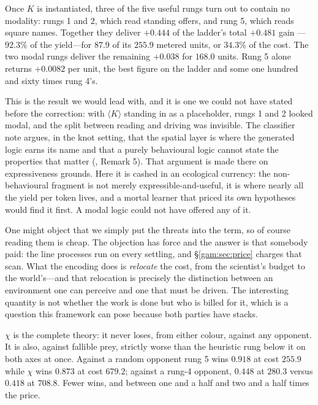 \begin{observation}\label{gam:obs:spatial}
Once $K$ is instantiated, three of the five useful rungs turn out to contain no
modality: rungs 1 and 2, which read standing offers, and rung 5, which reads
square names. Together they deliver $+0.444$ of the ladder's total $+0.481$ gain
---$92.3\%$ of the yield---for $87.9$ of its $255.9$ metered units, or $34.3\%$
of the cost. The two modal rungs deliver the remaining $+0.038$ for $168.0$
units. Rung 5 alone returns $+0.0082$ per unit, the best figure on the ladder
and some one hundred and sixty times rung 4's.
\end{observation}

This is the result we would lead with, and it is one we could not have stated
before the correction: with $\langle K\rangle$ standing in as a placeholder,
rungs 1 and 2 looked modal, and the split between reading and driving was
invisible. The classifier note argues, in the knot setting, that the spatial
layer is where the generated logic earns its name and that a purely behavioural
logic cannot state the properties that matter (\cite{ClassifierNote}, Remark 5).
That argument is made there on expressiveness grounds. Here it is cashed in an
ecological currency: the non-behavioural fragment is not merely
expressible-and-useful, it is where nearly all the yield per token lives, and a
mortal learner that priced its own hypotheses would find it first. A modal logic
could not have offered any of it.

\begin{remark}\label{gam:why-this-artefact-encoding}
One might object that we simply put the threats into the term, so of course
reading them is cheap. The objection has force and the answer is that somebody
paid: the line processes run on every settling, and \S\ref{gam:sec:price} charges
that scan. What the encoding does is \emph{relocate} the cost, from the
scientist's budget to the world's---and that relocation is precisely the
distinction between an environment one can perceive and one that must be driven.
The interesting quantity is not whether the work is done but who is billed for
it, which is a question this framework can pose because both parties have
stacks.
\end{remark}

\begin{observation}\label{gam:obs:chi}
$\chi$ is the complete theory: it never loses, from either colour, against any
opponent. It is also, against fallible prey, strictly worse than the heuristic
rung below it on both axes at once. Against a random opponent rung 5 wins
$0.918$ at cost $255.9$ while $\chi$ wins $0.873$ at cost $679.2$; against a
rung-4 opponent, $0.448$ at $280.3$ versus $0.418$ at $708.8$. Fewer wins, and
between one and a half and two and a half times the price.
\end{observation}

